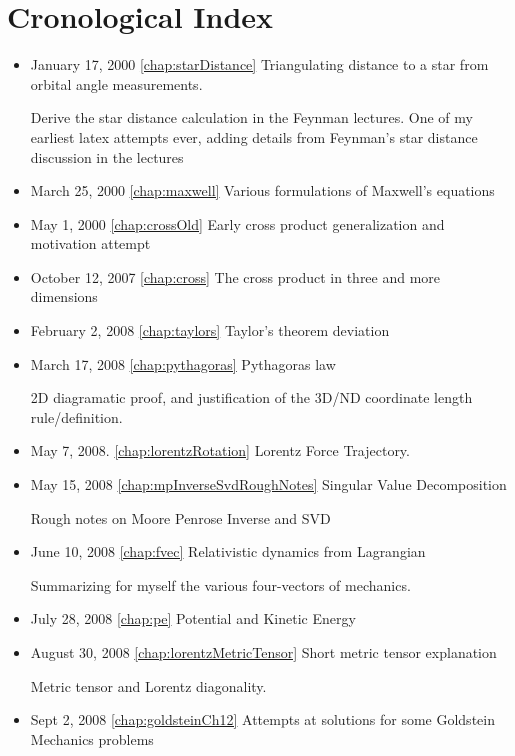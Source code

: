 \chapter{Cronological Index}
\label{chap:Cronology}

\begin{itemize}

\item January 17, 2000 \ref{chap:starDistance} Triangulating distance to a star from orbital angle measurements.

Derive the star distance calculation in the Feynman lectures.  One of my earliest latex attempts ever, adding details from Feynman's star distance discussion in the lectures\item March 25, 2000 \ref{chap:maxwell} Various formulations of Maxwell's equations

\item May 1, 2000 \ref{chap:crossOld} Early cross product generalization and motivation attempt

\item October 12, 2007 \ref{chap:cross} The cross product in three and more dimensions

\item February 2, 2008 \ref{chap:taylors} Taylor's theorem deviation

\item March 17, 2008 \ref{chap:pythagoras} Pythagoras law

2D diagramatic proof, and justification of the 3D/ND coordinate length rule/definition.\item May 7, 2008. \ref{chap:lorentzRotation} Lorentz Force Trajectory.

\item May 15, 2008 \ref{chap:mpInverseSvdRoughNotes} Singular Value Decomposition

Rough notes on Moore Penrose Inverse and SVD\item June 10, 2008 \ref{chap:fvec} Relativistic dynamics from Lagrangian

Summarizing for myself the various four-vectors of mechanics.\item July 28, 2008 \ref{chap:pe} Potential and Kinetic Energy

\item August 30, 2008 \ref{chap:lorentzMetricTensor} Short metric tensor explanation

Metric tensor and Lorentz diagonality.\item Sept 2, 2008 \ref{chap:goldsteinCh12} Attempts at solutions for some Goldstein Mechanics problems


\end{itemize}
